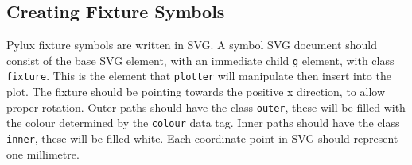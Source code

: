 \documentclass[a4paper]{article}
\begin{document}
\subsection{Creating Fixture Symbols}
Pylux fixture symbols are written in SVG. A symbol SVG document should 
consist of the base SVG element, with an immediate child \texttt{g} element, 
with class \texttt{fixture}. This is the element that \texttt{plotter} will 
manipulate then insert into the plot. The fixture should be pointing towards 
the positive x direction, to allow proper rotation. Outer paths should have 
the class \texttt{outer}, these will be filled with the colour determined by 
the \texttt{colour} data tag. Inner paths should have the class 
\texttt{inner}, these will be filled white. Each coordinate point in SVG 
should represent one millimetre.
\end{document}
